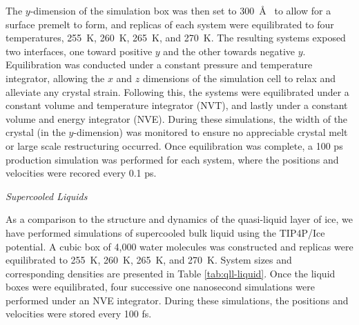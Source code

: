 The $y$-dimension of the simulation box was then set to 300~\AA~ to
allow for a surface premelt to form, and replicas of each system were
equilibrated to four temperatures, 255~K, 260~K, 265~K, and 270~K. The
resulting systems exposed two interfaces, one toward positive $y$ and
the other towards negative $y$. Equilibration was conducted under a
constant pressure and temperature integrator, allowing the $x$ and $z$
dimensions of the simulation cell to relax and alleviate any crystal
strain. Following this, the systems were equilibrated under a constant
volume and temperature integrator (NVT), and lastly under a constant
volume and energy integrator (NVE). During these simulations, the
width of the crystal (in the $y$-dimension) was monitored to ensure no
appreciable crystal melt or large scale restructuring occurred. Once
equilibration was complete, a 100 ps production simulation was
performed for each system, where the positions and velocities were
recored every 0.1 ps.





\begin{flushleft}
\textit{Supercooled Liquids}
\end{flushleft}
As a comparison to the structure and dynamics of the quasi-liquid
layer of ice, we have performed simulations of supercooled bulk liquid using the
TIP4P/Ice potential. A cubic box of 4,000 water molecules was
constructed and replicas were equilibrated to 255~K, 260~K, 265~K, and
270~K. System sizes and corresponding densities are presented in Table
\ref{tab:qll-liquid}. Once the liquid boxes were equilibrated, four
successive one nanosecond simulations were performed under an NVE
integrator. During these simulations, the positions and velocities
were stored every 100 fs.

